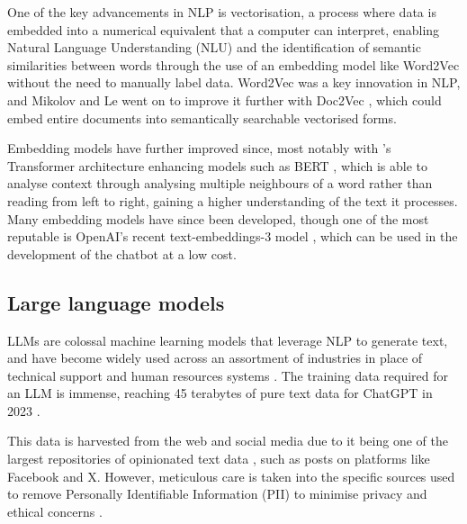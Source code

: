 \documentclass[12pt]{report}
\begin{document}
    One of the key advancements in NLP is vectorisation, a process where data is embedded into a numerical equivalent that a computer can interpret, 
    enabling Natural Language Understanding (NLU) and the identification of semantic similarities between words through the use of an embedding model 
    like Word2Vec \autocite{mikolov_efficient_2013} without the need to manually label data. 
    Word2Vec was a key innovation in NLP, and Mikolov and Le went on to improve it further with Doc2Vec \autocite{le_distributed_2014}, which could embed 
    entire documents into semantically searchable vectorised forms.
    
    Embedding models have further improved since, most notably with \textcite{vaswani_attention_2017}'s Transformer architecture enhancing models such as 
    BERT \autocite{devlin_bert_2019}, which is able to analyse context through analysing multiple neighbours of a word rather than reading from left to right,
    gaining a higher understanding of the text it processes. Many embedding models have since been developed, though one of the most reputable is OpenAI's 
    recent text-embeddings-3 model \autocite{openai_vector_nodate}, which can be used in the development of the chatbot at a low cost. 
    

    \pagebreak 

    \subsection{Large language models}

    LLMs are colossal machine learning models that leverage NLP to generate text, and have become widely used across 
    an assortment of industries in place of technical support and human resources systems \autocite{vrontis_artificial_2022}. The training data required for an LLM is immense, 
    reaching 45 terabytes of pure text data for ChatGPT in 2023 \autocite{dwivedi_so_2023}. 
    
    This data is harvested from the web \autocite{dubey_llama_2024}
    and social media due to it being one of the largest repositories of opinionated text data \autocite{wang_fine-grained_2016}, 
    such as posts on platforms like Facebook and X. However, meticulous care is taken into the specific sources used to remove 
    Personally Identifiable Information (PII) to minimise privacy and ethical concerns \autocite{dubey_llama_2024}.
    
\end{document}
